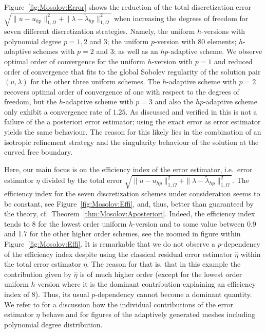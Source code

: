 \documentclass[12pt,twoside,reqno]{amsart}
\theoremstyle{definition}
\numberwithin{equation}{section}
\begin{document}
Figure~\ref{fig:Mosolov:Error} shows the reduction of the total discretization error $\sqrt{\|u-u_{hp}\|_{1,\Omega}^2 + \|\lambda-\tilde{\lambda}_{hp}\|_{1,\Omega}^2}$ when increasing the degrees of freedom for seven different discretization strategies. Namely, the uniform $h$-versions with polynomial degree $p=1,2$ and $3$; the uniform $p$-version with $80$ elements; $h$-adaptive schemes with $p=2$ and $3$; as well as an $hp$-adaptive scheme. We observe optimal order of convergence for the uniform $h$-version with $p=1$ and reduced order of convergence that fits to the global Sobolev regularity of the solution pair $(u,\lambda)$ for the other three uniform schemes. The $h$-adaptive scheme with $p=2$ recovers optimal order of convergence of one with respect to the degrees of freedom, but the $h$-adaptive scheme with $p=3$ and also the $hp$-adaptive scheme only exhibit a convergence rate of $1.25$. As discussed and verified in \cite{Banz2022} this is not a failure of the a posteriori error estimator; using the exact error as error estimator yields the same behaviour.  The reason for this likely lies in the combination of an isotropic refinement strategy and the singularity behaviour of the solution at the curved free boundary.  

Here, our main focus is on the efficiency index of the error estimator, i.e.~error estimator $\eta$ divided by the total error $\sqrt{\|u-u_{hp}\|_{1,\Omega}^2 + \|\lambda-\tilde{\lambda}_{hp}\|_{1,\Omega}^2}$. The efficiency index for the seven discretization schemes under consideration seems to be constant, see Figure~\ref{fig:Mosolov:Effi}, and, thus, better than guaranteed by the theory, cf.~Theorem~\ref{thm:Mosolov:Aposteriori}. Indeed, the efficiency index tends to $8$ for the lowest order uniform $h$-version and to some value between 0.9 and 1.7 for the other higher order schemes, see the zoomed in figure within Figure~\ref{fig:Mosolov:Effi}. It is remarkable that we do not observe a $p$-dependency of the efficiency index despite using the classical residual error estimator $\hat{\eta}$ within the total error estimator $\eta$. The reason for that is, that in this example the contribution given by $\hat{\eta}$ is of much higher order (except for the lowest order uniform $h$-version where it is the dominant contribution explaining an efficiency index of 8). Thus, its usual $p$-dependency cannot become a dominant quantity. 
We refer to \cite{Banz2022} for a discussion how the individual contributions of the error estimator $\eta$ behave and for figures of the adaptively generated meshes including polynomial degree distribution.
\end{document}
